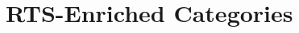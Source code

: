 \documentclass[11pt,notitlepage,a4paper]{report}
\begin{document}
  
  
  
  
  
  

\chapter{RTS-Enriched Categories}

  

\clearpage
{}
{}



\end{document}
